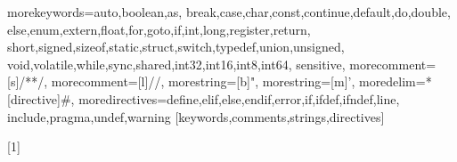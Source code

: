 

%
  {morekeywords={auto,boolean,as,
      break,case,char,const,continue,default,do,double,%
      else,enum,extern,float,for,goto,if,int,long,register,return,%
      short,signed,sizeof,static,struct,switch,typedef,union,unsigned,%
      void,volatile,while,sync,shared,int32,int16,int8,int64},%
  sensitive,%
  morecomment=[s]{/*}{*/},%
  morecomment=[l]//,%
  morestring=[b]",%
  morestring=[m]',%
  moredelim=*[directive]\#,%
  moredirectives={define,elif,else,endif,error,if,ifdef,ifndef,line,%
  include,pragma,undef,warning}%
}[keywords,comments,strings,directives]%


[1]{
  \mathligsoff
  \lstset{style=pseudoC}
  \lstset{#1}
}{}

